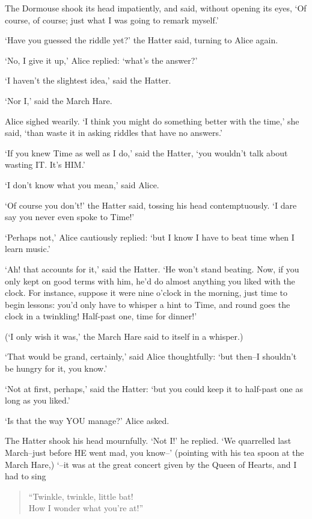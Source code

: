 \documentclass[12pt]{book}
\begin{document}
  The Dormouse shook its head impatiently, and said, without
opening its eyes, `Of course, of course; just what I was going to
remark myself.'

  `Have you guessed the riddle yet?' the Hatter said, turning to
Alice again.

  `No, I give it up,' Alice replied:  `what's the answer?'

  `I haven't the slightest idea,' said the Hatter.

  `Nor I,' said the March Hare.

  Alice sighed wearily.  `I think you might do something better
with the time,' she said, `than waste it in asking riddles that
have no answers.'

  `If you knew Time as well as I do,' said the Hatter, `you
wouldn't talk about wasting IT.  It's HIM.'

  `I don't know what you mean,' said Alice.

  `Of course you don't!' the Hatter said, tossing his head
contemptuously.  `I dare say you never even spoke to Time!'

  `Perhaps not,' Alice cautiously replied:  `but I know I have to
beat time when I learn music.'

  `Ah! that accounts for it,' said the Hatter.  `He won't stand
beating.  Now, if you only kept on good terms with him, he'd do
almost anything you liked with the clock.  For instance, suppose
it were nine o'clock in the morning, just time to begin lessons:
you'd only have to whisper a hint to Time, and round goes the
clock in a twinkling!  Half-past one, time for dinner!'

  (`I only wish it was,' the March Hare said to itself in a
whisper.)

  `That would be grand, certainly,' said Alice thoughtfully:
`but then--I shouldn't be hungry for it, you know.'

  `Not at first, perhaps,' said the Hatter:  `but you could keep
it to half-past one as long as you liked.'

  `Is that the way YOU manage?' Alice asked.

  The Hatter shook his head mournfully.  `Not I!' he replied.
`We quarrelled last March--just before HE went mad, you know--'
(pointing with his tea spoon at the March Hare,) `--it was at the
great concert given by the Queen of Hearts, and I had to sing

\begin{verse}
            ``Twinkle, twinkle, little bat!\\
            How I wonder what you're at!''
\end{verse}
\end{document}
